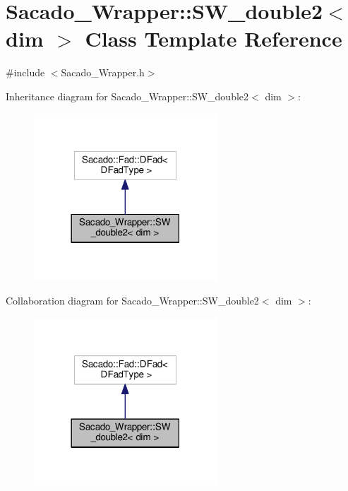 \hypertarget{classSacado__Wrapper_1_1SW__double2}{}\section{Sacado\+\_\+\+Wrapper\+:\+:S\+W\+\_\+double2$<$ dim $>$ Class Template Reference}
\label{classSacado__Wrapper_1_1SW__double2}


{\ttfamily \#include $<$Sacado\+\_\+\+Wrapper.\+h$>$}



Inheritance diagram for Sacado\+\_\+\+Wrapper\+:\+:S\+W\+\_\+double2$<$ dim $>$\+:\nopagebreak
\begin{figure}[H]
\begin{center}
\leavevmode
\includegraphics[width=194pt]{classSacado__Wrapper_1_1SW__double2__inherit__graph}
\end{center}
\end{figure}


Collaboration diagram for Sacado\+\_\+\+Wrapper\+:\+:S\+W\+\_\+double2$<$ dim $>$\+:\nopagebreak
\begin{figure}[H]
\begin{center}
\leavevmode
\includegraphics[width=194pt]{classSacado__Wrapper_1_1SW__double2__coll__graph}
\end{center}
\end{figure}
